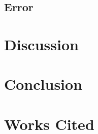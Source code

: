 \documentclass[11pt]{article}
\begin{document}
\subsection{Error}

\section{Discussion}

\section{Conclusion}

\section{Works Cited}


\end{document}
